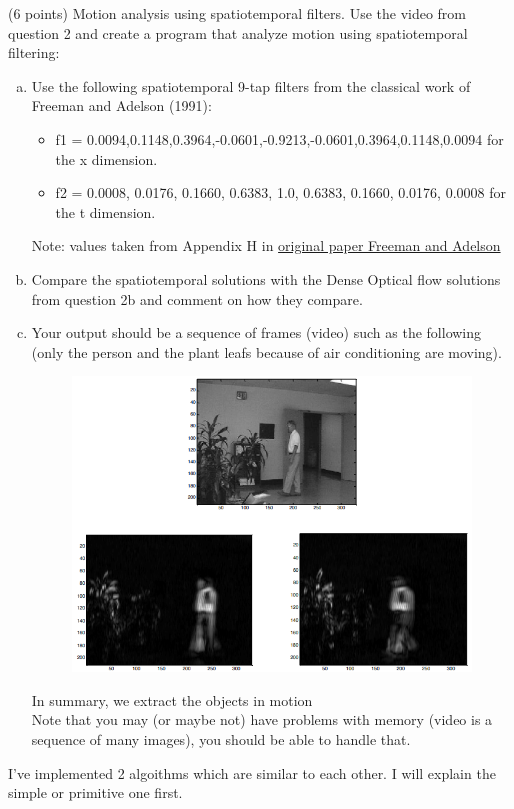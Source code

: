 \documentclass[UTF-8]{article}
\begin{document}
(6 points) Motion analysis using spatiotemporal filters. Use the video from question 2 and
create a program that analyze motion using spatiotemporal filtering:

\begin{enumerate}[a.]
	\item Use the following spatiotemporal 9-tap filters from the classical work of Freeman
	and Adelson (1991):
	\begin{itemize}
		\item f1 = {0.0094,0.1148,0.3964,-0.0601,-0.9213,-0.0601,0.3964,0.1148,0.0094}
		for the x dimension.
		\item f2 = {0.0008, 0.0176, 0.1660, 0.6383, 1.0, 0.6383, 0.1660, 0.0176, 0.0008}
		for the t dimension.
	\end{itemize}
	Note: values taken from Appendix H in \href{http://people.csail.mit.edu/billf/www/papers/steerpaper91FreemanAdelson.pdf}{original paper Freeman and Adelson}
	\item Compare the spatiotemporal solutions with the Dense Optical flow solutions from
	question 2b and comment on how they compare.
	\item Your output should be a sequence of frames (video) such as the following (only the
	person and the plant leafs because of air conditioning are moving).
	\begin{figure}[H]
		\centering
		\includegraphics[width=0.7\linewidth]{_images/instructions3c}
		\label{fig:instructions2c}
	\end{figure}
	In summary, we extract the objects in motion\\
	Note that you may (or maybe not) have problems with memory (video is a sequence
	of many images), you should be able to handle that.
\end{enumerate}

I've implemented 2 algoithms which are similar to each other. I will explain the simple or primitive one first.\\
\end{document}
